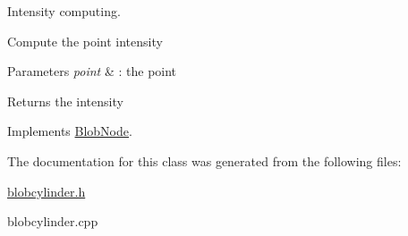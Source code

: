 Intensity computing. 

Compute the point intensity


\begin{DoxyParams}{Parameters}
{\em point} & : the point \\
\hline
\end{DoxyParams}
\begin{DoxyReturn}{Returns}
the intensity 
\end{DoxyReturn}


Implements \hyperlink{class_blob_node_a4987f9060e9141647c514efd9859d0ba}{BlobNode}.



The documentation for this class was generated from the following files:\begin{DoxyCompactItemize}
\item 
\hyperlink{blobcylinder_8h}{blobcylinder.h}\item 
blobcylinder.cpp\end{DoxyCompactItemize}
